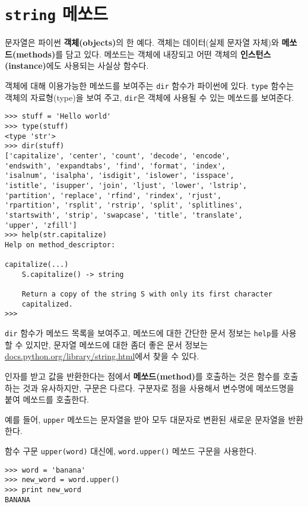 \section{    {\tt string} 메쏘드}
문자열은 파이썬 {\bf 객체(objects)}의 한 예다. 
객체는 데이터(실제 문자열 자체)와 {\bf 메쏘드(methods)}를 담고 있다.
메쏘드는 객체에 내장되고 어떤 객체의 {\bf 인스턴스(instance)}에도 사용되는 사실상 함수다.

객체에 대해 이용가능한 메쏘드를 보여주는 {\tt dir} 함수가 파이썬에 있다.
{\tt type} 함수는 객체의 자료형(type)을 보여 주고, {\tt dir}은 객체에 사용될 수 있는 메쏘드를 보여준다.

\beforeverb
\begin{verbatim}
>>> stuff = 'Hello world'
>>> type(stuff)
<type 'str'>
>>> dir(stuff)
['capitalize', 'center', 'count', 'decode', 'encode', 
'endswith', 'expandtabs', 'find', 'format', 'index', 
'isalnum', 'isalpha', 'isdigit', 'islower', 'isspace', 
'istitle', 'isupper', 'join', 'ljust', 'lower', 'lstrip', 
'partition', 'replace', 'rfind', 'rindex', 'rjust', 
'rpartition', 'rsplit', 'rstrip', 'split', 'splitlines', 
'startswith', 'strip', 'swapcase', 'title', 'translate', 
'upper', 'zfill']
>>> help(str.capitalize)
Help on method_descriptor:

capitalize(...)
    S.capitalize() -> string
    
    Return a copy of the string S with only its first character
    capitalized.
>>>
\end{verbatim}
\afterverb
%

{\tt dir} 함수가 메쏘드 목록을 보여주고, 메쏘드에 대한 간단한 문서 정보는 {\tt help}를 사용할 수 있지만,
문자열 메쏘드에 대한 좀더 좋은 문서 정보는 \url{docs.python.org/library/string.html}에서 찾을 수 있다.

인자를 받고 값을 반환한다는 점에서 {\bf 메쏘드(method)}를 호출하는 것은 함수를 호출하는 것과 유사하지만, 구문은 다르다.
구분자로 점을 사용해서 변수명에 메쏘드명을 붙여 메쏘드를 호출한다.

예를 들어, {\tt upper} 메쏘드는 문자열을 받아 모두 대문자로 변환된 새로운 문자열을 반환한다.


함수 구문 {\tt upper(word)} 대신에, {\tt word.upper()} 메쏘드 구문을 사용한다.


\beforeverb
\begin{verbatim}
>>> word = 'banana'
>>> new_word = word.upper()
>>> print new_word
BANANA
\end{verbatim}
\afterverb
%

